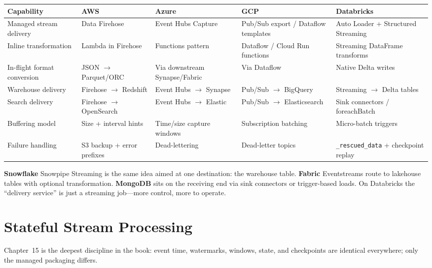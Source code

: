 \begin{center}
\footnotesize
\begin{tabular}{@{}p{2.4cm}p{2.9cm}p{2.9cm}p{2.9cm}p{2.9cm}@{}}
\toprule
\textbf{Capability} & \textbf{AWS} & \textbf{Azure} & \textbf{GCP} & \textbf{Databricks} \\
\midrule
Managed stream delivery & Data Firehose & Event Hubs Capture & Pub/Sub export / Dataflow templates & Auto Loader + Structured Streaming \\
Inline transformation & Lambda in Firehose & Functions pattern & Dataflow / Cloud Run functions & Streaming DataFrame transforms \\
In-flight format conversion & JSON $\rightarrow$ Parquet/ORC & Via downstream Synapse/Fabric & Via Dataflow & Native Delta writes \\
Warehouse delivery & Firehose $\rightarrow$ Redshift & Event Hubs $\rightarrow$ Synapse & Pub/Sub $\rightarrow$ BigQuery & Streaming $\rightarrow$ Delta tables \\
Search delivery & Firehose $\rightarrow$ OpenSearch & Event Hubs $\rightarrow$ Elastic & Pub/Sub $\rightarrow$ Elasticsearch & Sink connectors / foreachBatch \\
\addlinespace
Buffering model & Size + interval hints & Time/size capture windows & Subscription batching & Micro-batch triggers \\
Failure handling & S3 backup + error prefixes & Dead-lettering & Dead-letter topics & \texttt{\_rescued\_data} + checkpoint replay \\
\bottomrule
\end{tabular}
\end{center}

\noindent \textbf{Snowflake} Snowpipe Streaming is the same idea aimed at one destination: the
warehouse table. \textbf{Fabric} Eventstreams route to lakehouse tables with optional
transformation. \textbf{MongoDB} sits on the receiving end via sink connectors or trigger-based
loads. On Databricks the ``delivery service'' is just a streaming job---more control, more to
operate.

\section{Stateful Stream Processing}
%
Chapter~15 is the deepest discipline in the book: event time, watermarks, windows, state, and
checkpoints are identical everywhere; only the managed packaging differs.

